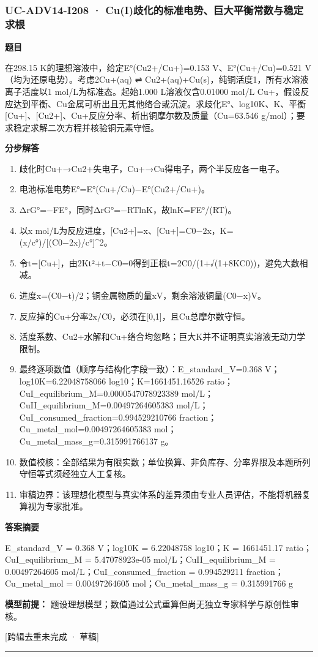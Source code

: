 \documentclass[UTF8,11pt,a4paper]{ctexart}
\begin{document}
\subsubsection*{UC-ADV14-I208 · Cu(I)歧化的标准电势、巨大平衡常数与稳定求根}
\noindent\textbf{题目}\par
在298.15 K的理想溶液中，给定E°(Cu2+/Cu+)=0.153 V、E°(Cu+/Cu)=0.521 V（均为还原电势）。考虑2Cu+(aq) ⇌ Cu2+(aq)+Cu(s)，纯铜活度1，所有水溶液离子活度以1 mol/L为标准态。起始1.000 L溶液仅含0.01000 mol/L Cu+，假设反应达到平衡、Cu金属可析出且无其他络合或沉淀。求歧化E°、log10K、K、平衡[Cu+]、[Cu2+]、Cu+反应分率、析出铜摩尔数及质量（Cu=63.546 g/mol）；要求稳定求解二次方程并核验铜元素守恒。\par
\medskip\noindent\textbf{分步解答}
\begin{enumerate}
\item 歧化时Cu+→Cu2+失电子，Cu+→Cu得电子，两个半反应各一电子。
\item 电池标准电势E°=E°(Cu+/Cu)−E°(Cu2+/Cu+)。
\item ΔrG°=−FE°，同时ΔrG°=−RTlnK，故lnK=FE°/(RT)。
\item 以x mol/L为反应进度，[Cu2+]=x、[Cu+]=C0−2x，K=(x/c°)/[(C0−2x)/c°]\textasciicircum{}2。
\item 令t=[Cu+]，由2Kt²+t−C0=0得到正根t=2C0/(1+√(1+8KC0))，避免大数相减。
\item 进度x=(C0−t)/2；铜金属物质的量xV，剩余溶液铜量(C0−x)V。
\item 反应掉的Cu+分率2x/C0，必须在[0,1]，且Cu总摩尔数守恒。
\item 活度系数、Cu2+水解和Cu+络合均忽略；巨大K并不证明真实溶液无动力学限制。
\item 最终逐项数值（顺序与结构化字段一致）：E\_standard\_V=0.368 V；log10K=6.22048758066 log10；K=1661451.16526 ratio；CuI\_equilibrium\_M=0.0000547078923389 mol/L；CuII\_equilibrium\_M=0.00497264605383 mol/L；CuI\_consumed\_fraction=0.994529210766 fraction；Cu\_metal\_mol=0.00497264605383 mol；Cu\_metal\_mass\_g=0.315991766137 g。
\item 数值校核：全部结果为有限实数；单位换算、非负库存、分率界限及本题所列守恒等式须经独立人工复核。
\item 审稿边界：该理想化模型与真实体系的差异须由专业人员评估，不能将机器复算视为专家批准。
\end{enumerate}
\noindent\textbf{答案摘要}\par
E\_standard\_V = 0.368 V；log10K = 6.22048758 log10；K = 1661451.17 ratio；CuI\_equilibrium\_M = 5.47078923e-05 mol/L；CuII\_equilibrium\_M = 0.00497264605 mol/L；CuI\_consumed\_fraction = 0.994529211 fraction；Cu\_metal\_mol = 0.00497264605 mol；Cu\_metal\_mass\_g = 0.315991766 g\par
\noindent\textbf{模型前提：}
题设理想模型；数值通过公式重算但尚无独立专家科学与原创性审核。\par
\noindent\textcolor{red!65!black}{[跨辑去重未完成 · 草稿]} \par
\medskip\hrule\medskip
{}
\end{document}
